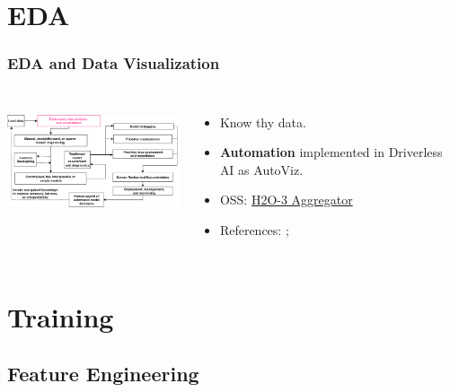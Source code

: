 \documentclass[11pt,
               aspectratio=169,
               hyperref={colorlinks}
               ]{beamer}
\begin{document}
	\section{EDA}
	
		\begin{frame}
		
			\frametitle{EDA and Data Visualization}		
			
			\begin{columns}
	
				\centering
				\includegraphics[height=100pt]{img/eda.png}
				
				\vspace{-5pt}
				\begin{itemize}
					\item Know thy data.
					\item \textbf{Automation} implemented in Driverless AI as AutoViz.
					\item OSS: \href{http://docs.h2o.ai/h2o/latest-stable/h2o-docs/data-science/aggregator.html}{H2O-3 Aggregator}
					\item References: ; 
				\end{itemize}
				
			\end{columns}
		
		\end{frame}

	\section{Training}

		\subsection{Feature Engineering}
\end{document}

